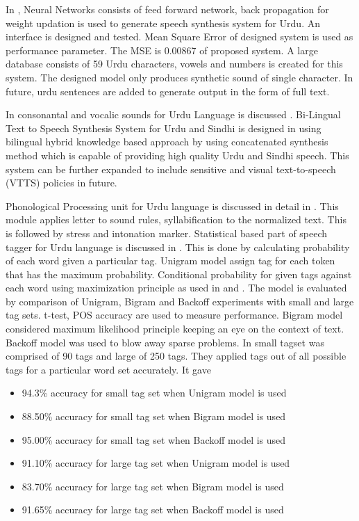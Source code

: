 In \cite{urdu_tts_db_kashif2015}, Neural Networks consists of feed forward network, back propagation for weight updation is used to generate 
speech synthesis system for Urdu. An interface is designed and tested. Mean Square Error of designed system is used as performance parameter. 
The MSE is 0.00867 of proposed system. A large database consists of 59 Urdu characters, vowels and numbers is created for this system. The designed model only
produces synthetic sound of single character. In future, urdu sentences are added to generate output in the form of full text.


In \cite{saleem2002urdu} consonantal and vocalic sounds for Urdu Language is discussed . Bi-Lingual Text to Speech Synthesis 
System for Urdu and Sindhi is designed in \cite{shah2004bi} using
bilingual hybrid knowledge based approach by using concatenated synthesis method which is capable of providing high quality 
Urdu and Sindhi speech. This system can be further expanded to include sensitive and visual text-to-speech (VTTS) policies in future.

Phonological Processing unit for Urdu language is discussed in detail in \cite{hussain2005phonological}. This module applies
letter to sound rules, syllabification to the normalized text. This is followed by stress and intonation
marker. Statistical based part of speech tagger for
Urdu language is discussed in \cite{anwar2007statistical}. This is done by calculating probability of each word given a particular tag. Unigram model assign tag for each token that has the maximum probability. Conditional probability for given tags against each word using maximization principle as used in \cite{bird2007introduction} and \cite{carlberger1999implementing}. The model is evaluated by comparison of Unigram, Bigram and Backoff experiments with small and large tag sets. t-test, POS accuracy are used to measure performance. Bigram model considered maximum likelihood principle keeping an
eye on the context of text. Backoff model was used to blow away sparse problems. In \cite{anwar2007statistical} small tagset was
comprised of 90 tags and large of 250 tags. They applied tags out of all possible tags for a particular word set accurately. It
gave

\begin{itemize}
	\item 94.3\% accuracy for small tag set when Unigram model is used
	\item 88.50\% accuracy for small tag set when Bigram model is used
	\item 95.00\% accuracy for small tag set when Backoff model is used
	\item 91.10\% accuracy for large tag set when Unigram model is used
	\item 83.70\% accuracy for large tag set when Bigram model is used
	\item 91.65\% accuracy for large tag set when Backoff model is used
\end{itemize}

